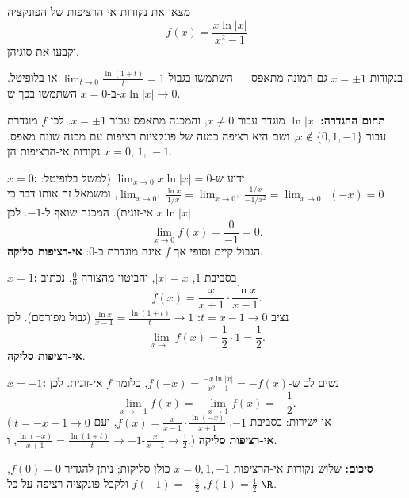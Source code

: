 
\begin{question}
מצאו את נקודות אי-הרציפות של הפונקציה
\[ f(x)=\frac{x\ln|x|}{x^2-1} \]
וקבעו את סוגיהן.
\end{question}

\begin{hint}
בנקודות $x=\pm1$ גם המונה מתאפס — השתמשו בגבול $\lim_{t\to0}\frac{\ln(1+t)}{t}=1$ או בלופיטל. ב-$x=0$ השתמשו בכך ש-$x\ln|x|\to0$.
\end{hint}

\begin{solution}
\textbf{תחום ההגדרה:} $\ln|x|$ מוגדר עבור $x\neq0$, והמכנה מתאפס עבור $x=\pm1$. לכן $f$ מוגדרת עבור $x\notin\{0,1,-1\}$, ושם היא רציפה כמנה של פונקציות רציפות עם מכנה שונה מאפס. נקודות אי-הרציפות הן $x=0,\,1,\,-1$.

\textbf{$x=0$:} ידוע ש-$\lim_{x\to0}x\ln|x|=0$ (למשל בלופיטל: $\lim_{x\to0^+}\frac{\ln x}{1/x}=\lim_{x\to0^+}\frac{1/x}{-1/x^2}=\lim_{x\to0^+}(-x)=0$, ומשמאל זה אותו דבר כי $x\ln|x|$ אי-זוגית). המכנה שואף ל-$-1$. לכן
\[ \lim_{x\to0}f(x)=\frac{0}{-1}=0. \]
הגבול קיים וסופי אך $f$ אינה מוגדרת ב-$0$: \textbf{אי-רציפות סליקה}.

\textbf{$x=1$:} בסביבת $1$, $|x|=x$, והביטוי מהצורה $\frac00$. נכתוב
\[ f(x)=\frac{x}{x+1}\cdot\frac{\ln x}{x-1}. \]
נציב $t=x-1\to0$: $\frac{\ln x}{x-1}=\frac{\ln(1+t)}{t}\to1$ (גבול מפורסם). לכן
\[ \lim_{x\to1}f(x)=\frac{1}{2}\cdot1=\frac12. \]
\textbf{אי-רציפות סליקה}.

\textbf{$x=-1$:} נשים לב ש-$f(-x)=\frac{-x\ln|x|}{x^2-1}=-f(x)$, כלומר $f$ אי-זוגית. לכן
\[ \lim_{x\to-1}f(x)=-\lim_{x\to1}f(x)=-\frac12. \]
(או ישירות: בסביבת $-1$, $f(x)=\frac{x}{x-1}\cdot\frac{\ln(-x)}{x+1}$, ועם $t=-x-1\to0$: $\frac{\ln(-x)}{x+1}=\frac{\ln(1+t)}{-t}\to-1$, ו-$\frac{x}{x-1}\to\frac12$.)
\textbf{אי-רציפות סליקה}.

\textbf{סיכום:} שלוש נקודות אי-הרציפות $x=0,1,-1$ כולן סליקות; ניתן להגדיר $f(0)=0$, $f(1)=\frac12$, $f(-1)=-\frac12$ ולקבל פונקציה רציפה על כל $\R$.
\end{solution}
